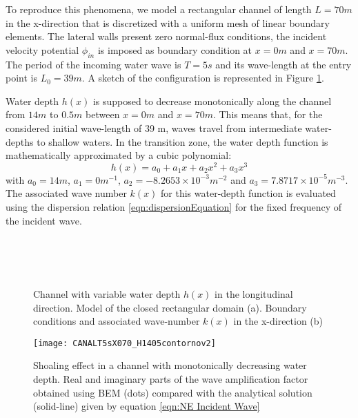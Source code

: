 To reproduce this phenomena, we model a rectangular channel of length $L=70m$ in the x-direction that is discretized with a uniform mesh of linear boundary elements. The lateral walls present zero normal-flux conditions, the incident velocity potential $\phi_{in}$ is imposed as boundary condition at $x=0m$ and $x=70m$. The period of the incoming water wave is $T=5s$ and its wave-length at the entry point is $L_{0}=39m$. A sketch of the configuration is represented in Figure \ref{fig:CANAL_SCHEME}.

Water depth $h(x)$ is supposed to decrease monotonically along the channel from $14m$ to $0.5m$ between $x=0m$ and $x=70m$. This means that, for the considered initial wave-length of 39 m, waves travel from intermediate water-depths to shallow waters. In the transition zone, the water depth function is mathematically approximated by a cubic polynomial:
%
\begin{equation}
\label{eqn:NE:Canal:profile}
h(x)=a_0+a_1x+a_2x^{2}+a_3x^{3}
\end{equation}
%
with $a_0=14m$, $a_1=0m^{-1}$, $a_2=-8.2653\times 10^{-3}m^{-2}$ and $a_3=7.8717\times 10^{-5}m^{-3}$. The associated wave number $k(x)$ for this water-depth function is evaluated using the dispersion relation \eqref{eqn:dispersionEquation} for the fixed frequency of the incident wave.

\begin{figure}
\centering
\def\svgwidth{0.9\columnwidth}
 \\
 \\
\def\svgwidth{0.9\columnwidth}
 \\
\caption{Channel with variable water depth $h(x)$ in the longitudinal direction. Model of the closed rectangular domain (a). Boundary conditions and associated wave-number $k(x)$ in the x-direction (b)}
\label{fig:CANAL_SCHEME}
\end{figure}

\begin{figure}
\begin{center}
\texttt{[image: CANALT5sX070\_H1405contornov2]}
\caption{Shoaling effect in a channel with monotonically decreasing water depth. Real and imaginary parts of the wave amplification factor obtained using BEM (dots) compared with the analytical solution (solid-line) given by equation \eqref{eqn:NE Incident Wave}}
\label{fig-Canal}
\end{center}
\end{figure}

